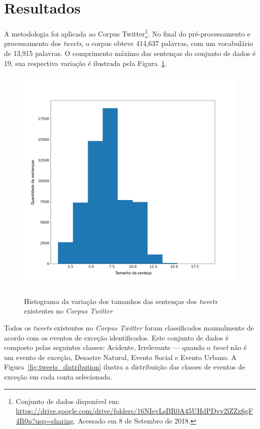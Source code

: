 \documentclass[
	12pt,				%
	oneside,			%
	a4paper,			%
	english,			%
	brazil				%
	]{abntex2ppgsi}
\begin{document}
{{{\section{Resultados}
	
A metodologia foi aplicada ao Corpus Twitter\footnote{Conjunto de dados disponível em: \url{https://drive.google.com/drive/folders/16NIevLsBR0A45UHdPDvv2lZZx6gF4R0p?usp=sharing}. Acessado em 8 de Setembro de 2018.}. No final do pré-processamento e processamento dos \textit{tweets}, o corpus obteve 414,637 palavras, com um vocabulário de 13,915 palavras. O comprimento máximo das sentenças do conjunto de dados é 19, sua respectiva variação é ilustrada pela Figura~\ref{fig:corpus_metrics}.
 
\begin{figure}[!htb]
	\centering
 	  \caption{Histograma da variação dos tamanhos das sentenças dos \textit{tweets} existentes no \textit{Corpus Twitter}}
		\includegraphics[width=1\linewidth]{images/corpus_metrics_pt.png}
	\label{fig:corpus_metrics}
\end{figure}

Todos os \textit{tweets} existentes no \textit{Corpus Twitter} foram classificados manualmente de acordo com os eventos de exceção identificados. Este conjunto de dados é composto pelas seguintes classes: Acidente, Irrelevante --- quando o \textit{tweet} não é um evento de exceção, Desastre Natural, Evento Social e Evento Urbano. A Figura~\ref{fig:tweets_distribution} ilustra a distribuição das classes de eventos de exceção em cada conta selecionada.

}}}
\end{document}
